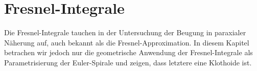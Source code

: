 %
%
%
\chapter{Fresnel-Integrale\label{chapter:fresnel}}
\begin{refsection}

{\parindent0pt Die} Fresnel-Integrale tauchen in der Untersuchung der Beugung
in paraxialer Näherung auf, auch bekannt als die Fresnel-Approximation.
In diesem Kapitel betrachen wir jedoch nur die geometrische
Anwendung der Fresnel-Integrale als Parametrisierung der Euler-Spirale
und zeigen, dass letztere eine Klothoide ist.






\printbibliography[heading=subbibliography]
\end{refsection}
